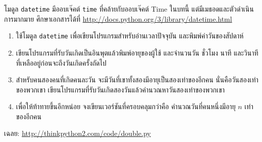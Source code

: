 \begin{exercise}


โมดูล {\tt datetime} มีออบเจ๊คต์  {\tt time} ที่คล้ายกับออบเจ๊คต์ Time ในบทนี้ 
แต่มีเมธอดและตัวดำเนินการมากมาย ศึกษาเอกสารได้ที่ \url{http://docs.python.org/3/library/datetime.html}


\begin{enumerate}

  
\item ใช้โมดูล {\tt datetime} เพื่อเขียนโปรแกรมสำหรับอ่านเวลาปัจจุบัน และพิมพ์ค่าวันของสัปดาห์


\item เขียนโปรแกรมที่รับวันเกิดเป็นอินพุตแล้วพิมพ์อายุของผู้ใช้ และจำนวนวัน ชั่วโมง นาที และวินาทีที่เหลืออยู่ก่อนจะถึงวันเกิดครั้งถัดไป


\item สำหรับคนสองคนที่เกิดคนละวัน จะมีวันที่เขาทั้งสองมีอายุเป็นสองเท่าของอีกคน นั่นคือวันสองเท่าของพวกเขา เขียนโปรแกรมที่รับวันเกิดสองวันแล้วคำนวณหาวันสองเท่าของพวกเขา


\item เพื่อให้ท้าทายขึ้นอีกหน่อย จงเขียนเวอร์ชันที่ครอบคลุมกว่าคือ คำนวณวันที่คนหนึ่งมีอายุ $n$ เท่าของอีกคน

\end{enumerate}

เฉลย: \url{http://thinkpython2.com/code/double.py}

\end{exercise}




